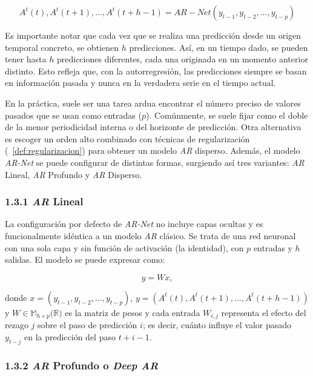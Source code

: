 \documentclass[12pt,twoside]{article}
\begin{document}
\begin{equation}
A^t(t),A^t(t+1),...,A^t(t+h-1) = AR-Net(y_{t-1},y_{t-2},...,y_{t-p})
\end{equation}

Es importante notar que cada vez que se realiza una predicción desde un origen temporal concreto, se obtienen $h$ predicciones. Así, en un tiempo dado, se pueden tener hasta $h$ predicciones diferentes, cada una originada en un momento anterior distinto. Esto refleja que, con la autorregresión, las predicciones siempre se basan en información pasada y nunca en la verdadera serie en el tiempo actual.

En la práctica, suele ser una tarea ardua encontrar el número preciso de valores pasados que se usan como entradas ($p$). Comúnmente, se suele fijar como el doble de la menor periodicidad interna o del horizonte de predicción. Otra alternativa es escoger un orden alto combinado con técnicas de regularización (~\ref{def:regularizacion}) para obtener un modelo \textit{AR} disperso. Además, el modelo \textit{AR-Net} se puede configurar de distintas formas, surgiendo así tres variantes: \textit{AR} Lineal, \textit{AR} Profundo y \textit{AR} Disperso.

\subsubsection*{1.3.1 \textit{AR} Lineal}\label{sec:25}

La configuración por defecto de \textit{AR-Net} no incluye capas ocultas y es funcionalmente idéntica a un modelo \textit{AR} clásico. Se trata de una red neuronal con una sola capa y sin función de activación (la identidad), con $p$ entradas y $h$ salidas. El modelo se puede expresar como: 

\begin{equation}
y=Wx,
\end{equation}

donde $x=(y_{t-1},y_{t-2},...,y_{t-p})$, $y=(A^t(t),A^t(t+1),...,A^t(t+h-1))$ y $W \in \mathbb{M}_{h \times p}(\mathbb{R)}$ es la matriz de pesos y cada entrada $W_{i,j}$ representa el efecto del rezago $j$ sobre el paso de predicción $i$; es decir, cuánto influye el valor pasado $y_{t-j}$ en la predicción del paso $t+i-1$.

\subsubsection*{1.3.2 \textit{AR} Profundo o \textit{Deep AR}}\label{sec:26}
\end{document}
